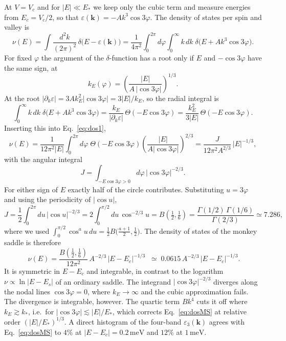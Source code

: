 \documentclass[12pt,a4paper]{article}
\newcommand{\bk}{\mathbf{k}}
\newcommand{\meV}{\,\mathrm{meV}}
\begin{document}
At $V=V_c$ and for $|E|\ll E_*$ we keep only the cubic term and measure energies from $E_c=V_c/2$, so that $\varepsilon(\bk)=-Ak^3\cos3\varphi$. The density of states per spin and valley is
\begin{equation}
\nu(E)=\int\!\frac{d^2k}{(2\pi)^2}\,\delta\big(E-\varepsilon(\bk)\big)
=\frac{1}{4\pi^2}\int_0^{2\pi}\!d\varphi\int_0^\infty\!k\,dk\;\delta\big(E+Ak^3\cos3\varphi\big).
\label{eq:dos1}
\end{equation}
For fixed $\varphi$ the argument of the $\delta$-function has a root only if $E$ and $-\cos3\varphi$ have the same sign, at
\begin{equation}
k_E(\varphi)=\left(\frac{|E|}{A\,|\cos3\varphi|}\right)^{1/3}.
\end{equation}
At the root $|\partial_k\varepsilon|=3Ak_E^2|\cos3\varphi|=3|E|/k_E$, so the radial integral is
\begin{equation}
\int_0^\infty\!k\,dk\;\delta\big(E+Ak^3\cos3\varphi\big)=\frac{k_E}{|\partial_k\varepsilon|}\,\Theta(-E\cos3\varphi)
=\frac{k_E^2}{3|E|}\,\Theta(-E\cos3\varphi).
\end{equation}
Inserting this into Eq.~\eqref{eq:dos1},
\begin{equation}
\nu(E)=\frac{1}{12\pi^2|E|}\int_0^{2\pi}\!d\varphi\;\Theta(-E\cos3\varphi)\left(\frac{|E|}{A|\cos3\varphi|}\right)^{2/3}
=\frac{J}{12\pi^2A^{2/3}}\,|E|^{-1/3},
\end{equation}
with the angular integral
\begin{equation}
J=\int_{-E\cos3\varphi>0}\!d\varphi\,|\cos3\varphi|^{-2/3}.
\end{equation}
For either sign of $E$ exactly half of the circle contributes. Substituting $u=3\varphi$ and using the periodicity of $|\cos u|$,
\begin{equation}
J=\frac12\int_0^{2\pi}\!du\,|\cos u|^{-2/3}=2\int_0^{\pi/2}\!du\,\cos^{-2/3}u
=B\!\left(\tfrac12,\tfrac16\right)=\frac{\Gamma(1/2)\,\Gamma(1/6)}{\Gamma(2/3)}\simeq7.286 ,
\end{equation}
where we used $\int_0^{\pi/2}\cos^{a}u\,du=\tfrac12B\big(\tfrac{a+1}2,\tfrac12\big)$. The density of states of the monkey saddle is therefore
\begin{equation}
\boxed{\;\nu(E)=\frac{B(\tfrac12,\tfrac16)}{12\pi^2}\,A^{-2/3}\,|E-E_c|^{-1/3}\;}
\;\simeq\;0.0615\,A^{-2/3}\,|E-E_c|^{-1/3}.
\label{eq:dosMS}
\end{equation}
It is symmetric in $E-E_c$ and integrable, in contrast to the logarithm $\nu\propto\ln|E-E_s|$ of an ordinary saddle. The integrand $|\cos3\varphi|^{-2/3}$ diverges along the nodal lines $\cos3\varphi=0$, where $k_E\to\infty$ and the cubic approximation fails. The divergence is integrable, however. The quartic term $Bk^4$ cuts it off where $k_E\gtrsim k_*$, i.e.\ for $|\cos3\varphi|\lesssim|E|/E_*$, which corrects Eq.~\eqref{eq:dosMS} at relative order $(|E|/E_*)^{1/3}$. A direct histogram of the four-band $\varepsilon_3(\bk)$ agrees with Eq.~\eqref{eq:dosMS} to $4\%$ at $|E-E_c|=0.2\meV$ and $12\%$ at $1\meV$.
\end{document}
